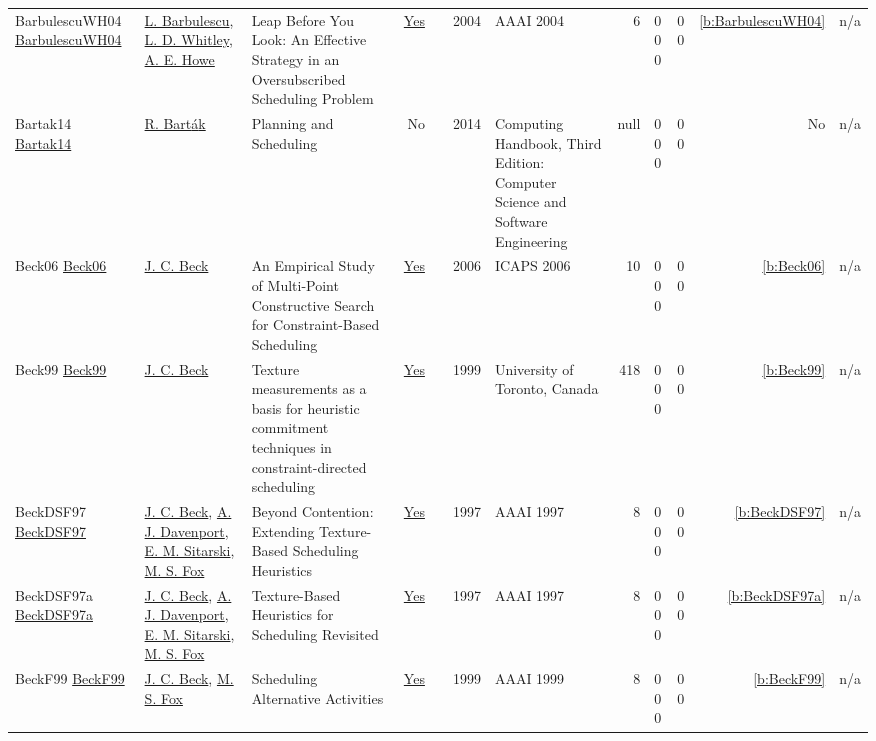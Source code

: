 {\begin{longtable}{>{\raggedright\arraybackslash}p{3cm}>{\raggedright\arraybackslash}p{4.5cm}>{\raggedright\arraybackslash}p{6.0cm}rrrp{2.5cm}rp{1cm}p{1cm}rr}
BarbulescuWH04 \href{http://www.aaai.org/Library/AAAI/2004/aaai04-023.php}{BarbulescuWH04} & \hyperref[auth:a1315]{L. Barbulescu}, \hyperref[auth:a1317]{L. D. Whitley}, \hyperref[auth:a1316]{A. E. Howe} & Leap Before You Look: An Effective Strategy in an Oversubscribed Scheduling Problem & \href{../works/BarbulescuWH04.pdf}{Yes} & \cite{BarbulescuWH04} & 2004 & AAAI 2004 & 6 & 0 0 0 & 0 0 & \ref{b:BarbulescuWH04} & n/a\\
Bartak14 \href{}{Bartak14} & \hyperref[auth:a152]{R. Bart{\'{a}}k} & Planning and Scheduling & No & \cite{Bartak14} & 2014 & Computing Handbook, Third Edition: Computer Science and Software Engineering & null & 0 0 0 & 0 0 & No & n/a\\
Beck06 \href{http://www.aaai.org/Library/ICAPS/2006/icaps06-028.php}{Beck06} & \hyperref[auth:a89]{J. C. Beck} & An Empirical Study of Multi-Point Constructive Search for Constraint-Based Scheduling & \href{../works/Beck06.pdf}{Yes} & \cite{Beck06} & 2006 & ICAPS 2006 & 10 & 0 0 0 & 0 0 & \ref{b:Beck06} & n/a\\
Beck99 \href{https://librarysearch.library.utoronto.ca/permalink/01UTORONTO_INST/14bjeso/alma991106162342106196}{Beck99} & \hyperref[auth:a89]{J. C. Beck} & Texture measurements as a basis for heuristic commitment techniques in constraint-directed scheduling & \href{../works/Beck99.pdf}{Yes} & \cite{Beck99} & 1999 & University of Toronto, Canada & 418 & 0 0 0 & 0 0 & \ref{b:Beck99} & n/a\\
BeckDSF97 \href{http://www.aaai.org/Library/AAAI/1997/aaai97-037.php}{BeckDSF97} & \hyperref[auth:a89]{J. C. Beck}, \hyperref[auth:a248]{A. J. Davenport}, \hyperref[auth:a1288]{E. M. Sitarski}, \hyperref[auth:a302]{M. S. Fox} & Beyond Contention: Extending Texture-Based Scheduling Heuristics & \href{../works/BeckDSF97.pdf}{Yes} & \cite{BeckDSF97} & 1997 & AAAI 1997 & 8 & 0 0 0 & 0 0 & \ref{b:BeckDSF97} & n/a\\
BeckDSF97a \href{http://www.aaai.org/Library/AAAI/1997/aaai97-038.php}{BeckDSF97a} & \hyperref[auth:a89]{J. C. Beck}, \hyperref[auth:a248]{A. J. Davenport}, \hyperref[auth:a1288]{E. M. Sitarski}, \hyperref[auth:a302]{M. S. Fox} & Texture-Based Heuristics for Scheduling Revisited & \href{../works/BeckDSF97a.pdf}{Yes} & \cite{BeckDSF97a} & 1997 & AAAI 1997 & 8 & 0 0 0 & 0 0 & \ref{b:BeckDSF97a} & n/a\\
BeckF99 \href{http://www.aaai.org/Library/AAAI/1999/aaai99-097.php}{BeckF99} & \hyperref[auth:a89]{J. C. Beck}, \hyperref[auth:a302]{M. S. Fox} & Scheduling Alternative Activities & \href{../works/BeckF99.pdf}{Yes} & \cite{BeckF99} & 1999 & AAAI 1999 & 8 & 0 0 0 & 0 0 & \ref{b:BeckF99} & n/a\\

\end{longtable}}
